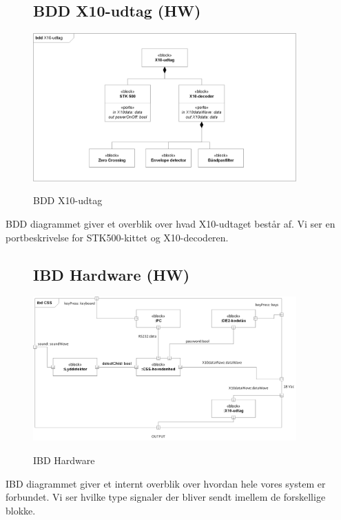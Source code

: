 \begin{figure}[H] \centering
\subsection{BDD X10-udtag (HW)}
{\includegraphics[width=0.9\textwidth]{billeder/diagrammer/BDD_Modtager}}
\caption{BDD X10-udtag}
\label{lab:bddmodtager}
\raggedright
\end{figure}
BDD diagrammet giver et overblik over hvad X10-udtaget består af. Vi ser en portbeskrivelse for STK500-kittet og X10-decoderen.

\begin{figure}[H] \centering
\subsection{IBD Hardware (HW)}
{\includegraphics[width=0.9\textwidth]{billeder/diagrammer/IBD_Hardware}}
\caption{IBD Hardware}
\label{lab:ibdhardware}
\raggedright
\end{figure}
IBD diagrammet giver et internt overblik over hvordan hele vores system er forbundet. Vi ser hvilke type signaler der bliver sendt imellem de forskellige blokke.

